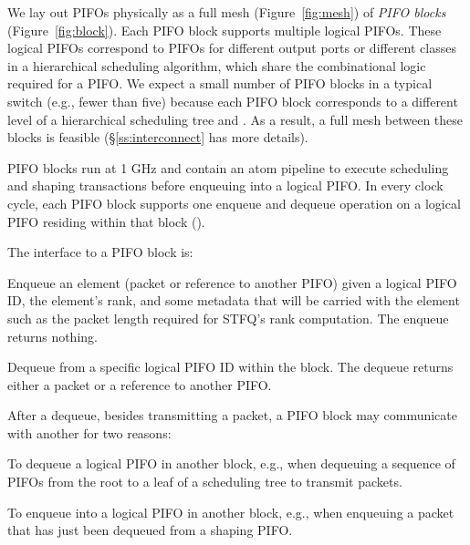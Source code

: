 We lay out PIFOs physically as a full mesh (Figure~\ref{fig:mesh}) of
{\em PIFO blocks} (Figure~\ref{fig:block}). Each PIFO block supports
multiple logical PIFOs. These logical PIFOs correspond to PIFOs for
different output ports or different classes in a
hierarchical scheduling algorithm, which share the combinational logic
required for a PIFO. We expect a small number of PIFO blocks in a
typical switch (e.g., fewer than five) because each PIFO block
corresponds to a different level of a hierarchical scheduling tree and
. As a result, a
full mesh between these blocks is feasible (\S\ref{ss:interconnect}
has more details).

PIFO blocks run at 1 GHz and contain an atom
pipeline to execute scheduling and shaping transactions before enqueuing into a
logical PIFO. In every clock cycle, each PIFO block supports one enqueue and
dequeue operation on a logical PIFO residing within that block
().

The interface to a PIFO block is:
\begin{CompactEnumerate}
\item Enqueue an element (packet or reference to another PIFO) given a
  logical PIFO ID, the element's rank, and some metadata that will be
  carried with the element such as the packet length required for
  STFQ's rank computation. The enqueue returns nothing.
  \item Dequeue from a specific logical PIFO ID within the block. The dequeue
   returns either a packet or a reference to another PIFO.
\end{CompactEnumerate}

After a dequeue, besides transmitting a packet, a PIFO block may
communicate with another for two reasons:
 \begin{CompactEnumerate}
 \item To dequeue a logical PIFO in another block, e.g., when dequeuing a
   sequence of PIFOs from the root to a leaf of a scheduling tree to transmit
   packets.
 
 \item To enqueue into a logical PIFO in another block, e.g., when
   enqueuing a packet that has just been dequeued from a shaping
   PIFO.
 \end{CompactEnumerate}

